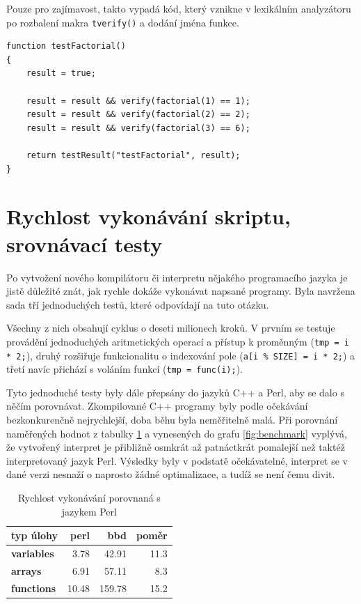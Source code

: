 \documentclass[11pt,twoside,a4paper]{book}
\begin{document}
Pouze pro zajímavost, takto vypadá kód, který vznikne v lexikálním analyzátoru po rozbalení makra \texttt{tverify()} a dodání jména funkce.

\begin{verbatim}
function testFactorial()
{
    result = true;

    result = result && verify(factorial(1) == 1);
    result = result && verify(factorial(2) == 2);
    result = result && verify(factorial(3) == 6);

    return testResult("testFactorial", result);
}
\end{verbatim}


\section{Rychlost vykonávání skriptu, srovnávací testy}

Po vytvožení nového kompilátoru či interpretu nějakého programacího jazyka je jistě důležité znát, jak rychle dokáže vykonávat napsané programy. Byla navržena sada tří jednoduchých testů, které odpovídají na tuto otázku.

Všechny z nich obsahují cyklus o deseti milionech kroků. V prvním se testuje provádění jednoduchých aritmetických operací a přístup k proměnným (\texttt{tmp = i * 2;}), druhý rozšiřuje funkcionalitu o indexování pole (\texttt{a[i \% SIZE] = i * 2;}) a třetí navíc přichází s voláním funkcí (\texttt{tmp = func(i);}).

Tyto jednoduché testy byly dále přepsány do jazyků C++ a Perl, aby se dalo s něčím porovnávat. Zkompilované C++ programy byly podle očekávání bezkonkurenčně nejrychlejší, doba běhu byla neměřitelně malá. Při porovnání naměřených hodnot z tabulky \ref{tab:benchmark} a vynesených do grafu \ref{fig:benchmark} vyplývá, že vytvořený interpret je přibližně osmkrát až patnáctkrát pomalejší než taktéž interpretovaný jazyk Perl. Výsledky byly v podstatě očekávatelné, interpret se v dané verzi nesnaží o naprosto žádné optimalizace, a tudíž se není čemu divit.

\begin{table}
\begin{center}
\begin{tabular}{|l||r|r||r|}
\hline
\textbf{typ úlohy} & \textbf{perl} & \textbf{bbd} & \textbf{poměr} \\
\hline \hline
\bf{variables} & 3.78 & 42.91 & 11.3 \\
\hline
\bf{arrays} & 6.91 & 57.11 & 8.3 \\
\hline
\bf{functions} & 10.48 & 159.78 & 15.2 \\
\hline
\end{tabular}
\end{center}
\caption{Rychlost vykonávání porovnaná s jazykem Perl}
\label{tab:benchmark}
\end{table}
\end{document}
